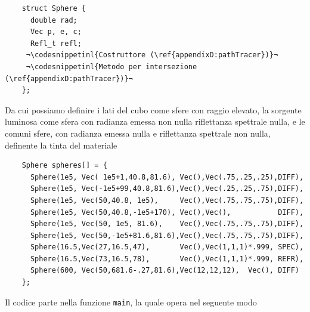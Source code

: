 \begin{verbatim}
	struct Sphere { 
	  double rad;
	  Vec p, e, c;
	  Refl_t refl;      
	 ¬\codesnippetinl{Costruttore (\ref{appendixD:pathTracer})}¬
	 ¬\codesnippetinl{Metodo per intersezione (\ref{appendixD:pathTracer})}¬
	}; 
\end{verbatim}
Da cui possiamo definire i lati del cubo come sfere con raggio elevato, la sorgente luminosa come sfera con radianza emessa non nulla riflettanza 
spettrale nulla, e le comuni sfere, con radianza emessa nulla e riflettanza spettrale non nulla, definente la tinta del materiale
\begin{verbatim}
	Sphere spheres[] = {
	  Sphere(1e5, Vec( 1e5+1,40.8,81.6), Vec(),Vec(.75,.25,.25),DIFF),
	  Sphere(1e5, Vec(-1e5+99,40.8,81.6),Vec(),Vec(.25,.25,.75),DIFF),
	  Sphere(1e5, Vec(50,40.8, 1e5),     Vec(),Vec(.75,.75,.75),DIFF),
	  Sphere(1e5, Vec(50,40.8,-1e5+170), Vec(),Vec(),           DIFF),
	  Sphere(1e5, Vec(50, 1e5, 81.6),    Vec(),Vec(.75,.75,.75),DIFF),
	  Sphere(1e5, Vec(50,-1e5+81.6,81.6),Vec(),Vec(.75,.75,.75),DIFF),
	  Sphere(16.5,Vec(27,16.5,47),       Vec(),Vec(1,1,1)*.999, SPEC),
	  Sphere(16.5,Vec(73,16.5,78),       Vec(),Vec(1,1,1)*.999, REFR),
	  Sphere(600, Vec(50,681.6-.27,81.6),Vec(12,12,12),  Vec(), DIFF) 
	}; 
\end{verbatim}
Il codice parte nella funzione \texttt{main}, la quale opera nel seguente modo
